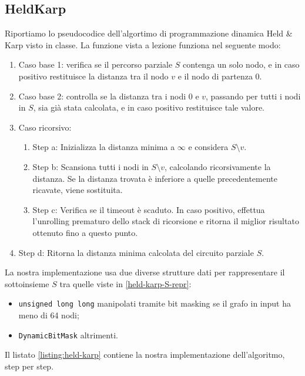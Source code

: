\subsection{HeldKarp}

Riportiamo lo pseudocodice dell'algortimo di programmazione dinamica Held \& Karp visto in classe. La funzione  vista a lezione funziona nel seguente modo:

\begin{enumerate}
    \item Caso base 1: verifica se il percorso parziale $S$ contenga un solo nodo, e in caso positivo restituisce la distanza tra il nodo $v$ e il nodo di partenza $0$.
    \item Caso base 2: controlla se la distanza tra i nodi $0$ e $v$, passando per tutti i nodi in $S$, sia già stata calcolata, e in caso positivo restituisce tale valore.
    \item Caso ricorsivo:
    \begin{enumerate}
        \item Step a: Inizializza la distanza minima a $\infty$ e considera $S \setminus {v}$.
        \item Step b: Scansiona tutti i nodi in $S \setminus {v}$, calcolando ricorsivamente la distanza. Se la distanza trovata è inferiore a quelle precedentemente ricavate, viene sostituita.
        \item Step c: Verifica se il timeout è scaduto. In caso positivo, effettua l'unrolling prematuro dello stack di ricorsione e ritorna il miglior risultato ottenuto fino a questo punto.
    \end{enumerate}
    \item Step d: Ritorna la distanza minima calcolata del circuito parziale $S$.
\end{enumerate}

\noindent La nostra implementazione usa due diverse strutture dati per rappresentare il sottoinsieme $S$ tra quelle viste in \ref{held-karp-S-repr}:

\begin{itemize}
    \item \texttt{unsigned long long} manipolati tramite bit masking se il grafo in input ha meno di 64 nodi;
    \item \texttt{DynamicBitMask} altrimenti.
\end{itemize}

\noindent Il listato \ref{listing:held-karp} contiene la nostra implementazione dell'algoritmo, step per step.

